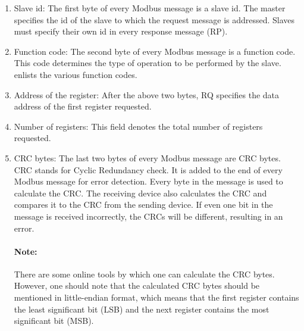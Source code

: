 \begin{enumerate}
  \item Slave id: The first byte of every Modbus message is a slave id.
        The master specifies the id of the slave to which the request message 
        is addressed. Slaves must specify their own id in every 
        response message (RP). 
  \item Function code: The second byte of every Modbus message is a
        function code. This code determines the type of operation to be 
        performed by the slave.  enlists the various 
        function codes. 
  \item Address of the register: After the above two bytes, RQ specifies the
        data address of the first register requested. 
  \item Number of registers: This field denotes the total number of
        registers requested. 
  \item CRC bytes: The last two bytes of every Modbus message are CRC
        bytes. CRC stands for Cyclic Redundancy check.  It is added to the 
        end of every Modbus message for error detection.  
        Every byte in the message is used to calculate the CRC. 
        The receiving device also calculates the CRC and compares it to the 
        CRC from the sending device. If even one bit in the message is 
        received incorrectly, the CRCs will be different, resulting in an error.
        
        \paragraph{Note:} There are some online tools \cite{online-crc} by which one can calculate 
        the CRC bytes. However, one should note that the calculated CRC bytes 
        should be mentioned in little-endian format, which means that 
        the first register contains the least significant bit (LSB) and the 
        next register contains the most significant bit (MSB).  
\end{enumerate}

